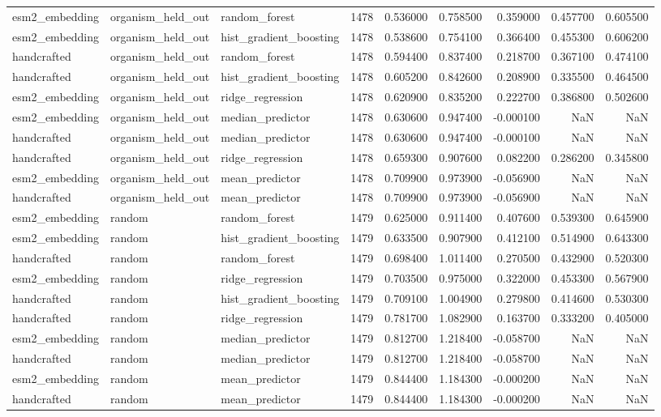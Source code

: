 \begin{longtable}{lllrrrrrr}
esm2\_embedding & organism\_held\_out & random\_forest & 1478 & 0.536000 & 0.758500 & 0.359000 & 0.457700 & 0.605500 \\
esm2\_embedding & organism\_held\_out & hist\_gradient\_boosting & 1478 & 0.538600 & 0.754100 & 0.366400 & 0.455300 & 0.606200 \\
handcrafted & organism\_held\_out & random\_forest & 1478 & 0.594400 & 0.837400 & 0.218700 & 0.367100 & 0.474100 \\
handcrafted & organism\_held\_out & hist\_gradient\_boosting & 1478 & 0.605200 & 0.842600 & 0.208900 & 0.335500 & 0.464500 \\
esm2\_embedding & organism\_held\_out & ridge\_regression & 1478 & 0.620900 & 0.835200 & 0.222700 & 0.386800 & 0.502600 \\
esm2\_embedding & organism\_held\_out & median\_predictor & 1478 & 0.630600 & 0.947400 & -0.000100 & NaN & NaN \\
handcrafted & organism\_held\_out & median\_predictor & 1478 & 0.630600 & 0.947400 & -0.000100 & NaN & NaN \\
handcrafted & organism\_held\_out & ridge\_regression & 1478 & 0.659300 & 0.907600 & 0.082200 & 0.286200 & 0.345800 \\
esm2\_embedding & organism\_held\_out & mean\_predictor & 1478 & 0.709900 & 0.973900 & -0.056900 & NaN & NaN \\
handcrafted & organism\_held\_out & mean\_predictor & 1478 & 0.709900 & 0.973900 & -0.056900 & NaN & NaN \\
esm2\_embedding & random & random\_forest & 1479 & 0.625000 & 0.911400 & 0.407600 & 0.539300 & 0.645900 \\
esm2\_embedding & random & hist\_gradient\_boosting & 1479 & 0.633500 & 0.907900 & 0.412100 & 0.514900 & 0.643300 \\
handcrafted & random & random\_forest & 1479 & 0.698400 & 1.011400 & 0.270500 & 0.432900 & 0.520300 \\
esm2\_embedding & random & ridge\_regression & 1479 & 0.703500 & 0.975000 & 0.322000 & 0.453300 & 0.567900 \\
handcrafted & random & hist\_gradient\_boosting & 1479 & 0.709100 & 1.004900 & 0.279800 & 0.414600 & 0.530300 \\
handcrafted & random & ridge\_regression & 1479 & 0.781700 & 1.082900 & 0.163700 & 0.333200 & 0.405000 \\
esm2\_embedding & random & median\_predictor & 1479 & 0.812700 & 1.218400 & -0.058700 & NaN & NaN \\
handcrafted & random & median\_predictor & 1479 & 0.812700 & 1.218400 & -0.058700 & NaN & NaN \\
esm2\_embedding & random & mean\_predictor & 1479 & 0.844400 & 1.184300 & -0.000200 & NaN & NaN \\
handcrafted & random & mean\_predictor & 1479 & 0.844400 & 1.184300 & -0.000200 & NaN & NaN \\
\end{longtable}
